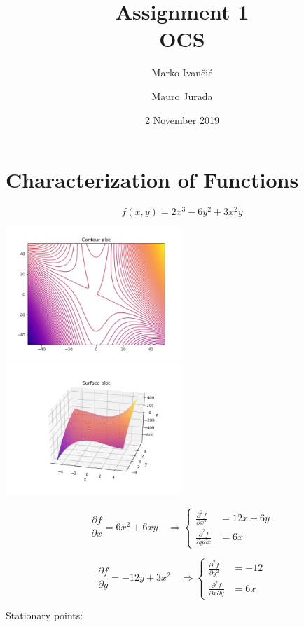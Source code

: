 \documentclass[12pt]{article}         %
\title{Assignment 1 \\ OCS}
\author{Marko Ivančić \and Mauro Jurada}
\date{2 November 2019}           %
\begin{document}
\maketitle


\section{Characterization of Functions}
\begin{equation}
	f(x,y) = 2x^3 - 6y^2 + 3x^2 y
\end{equation}

\includegraphics[width=0.5\textwidth]{Figure_1}
\includegraphics[width=0.5\textwidth]{Surface_1}

$$
\frac {\partial f}{\partial x} = 6x^2 + 6xy \quad\Rightarrow 
	\left\{
	\begin{aligned}
		\frac {\partial^2 f}{\partial x^2}&=12x+6y\\ 
		\frac {\partial^2 f}{\partial y \partial x}&=6x
	 \end{aligned} 
	 \right.
$$

$$
\frac {\partial f}{\partial y} = -12y+3x^2 \quad\Rightarrow 
	\left\{
	\begin{aligned}
		\frac {\partial^2 f}{\partial y^2}&=-12\\ 
		\frac {\partial^2 f}{\partial x \partial y}&=6x
	 \end{aligned} 
	 \right.
$$

Stationary points:
\end{document}
